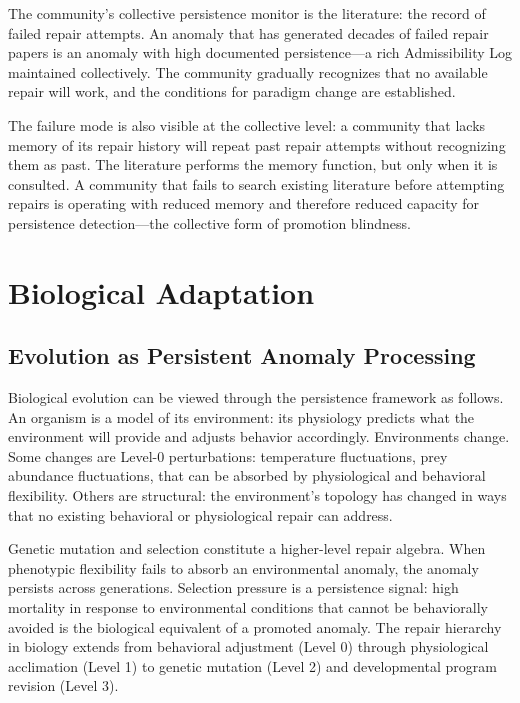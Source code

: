 \documentclass[12pt,oneside]{book}
\theoremstyle{plain}
\theoremstyle{definition}
\theoremstyle{remark}
\newcommand{\1}{\mathbf{1}}
\begin{document}
The community's collective persistence monitor is the literature: the record of failed repair attempts. An anomaly that has generated decades of failed repair papers is an anomaly with high documented persistence---a rich Admissibility Log maintained collectively. The community gradually recognizes that no available repair will work, and the conditions for paradigm change are established.

The failure mode is also visible at the collective level: a community that lacks memory of its repair history will repeat past repair attempts without recognizing them as past. The literature performs the memory function, but only when it is consulted. A community that fails to search existing literature before attempting repairs is operating with reduced memory and therefore reduced capacity for persistence detection---the collective form of promotion blindness.


\chapter{Biological Adaptation}

\section{Evolution as Persistent Anomaly Processing}

Biological evolution can be viewed through the persistence framework as follows. An organism is a model of its environment: its physiology predicts what the environment will provide and adjusts behavior accordingly. Environments change. Some changes are Level-0 perturbations: temperature fluctuations, prey abundance fluctuations, that can be absorbed by physiological and behavioral flexibility. Others are structural: the environment's topology has changed in ways that no existing behavioral or physiological repair can address.

Genetic mutation and selection constitute a higher-level repair algebra. When phenotypic flexibility fails to absorb an environmental anomaly, the anomaly persists across generations. Selection pressure is a persistence signal: high mortality in response to environmental conditions that cannot be behaviorally avoided is the biological equivalent of a promoted anomaly. The repair hierarchy in biology extends from behavioral adjustment (Level 0) through physiological acclimation (Level 1) to genetic mutation (Level 2) and developmental program revision (Level 3).
\end{document}
